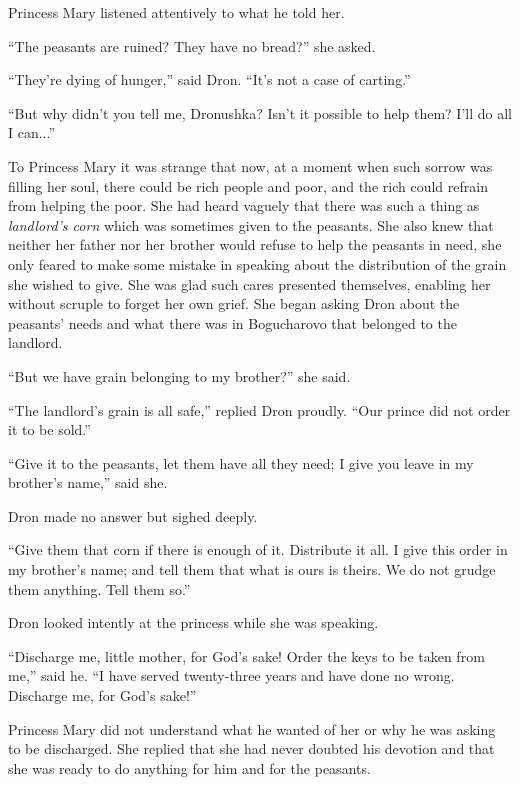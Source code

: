 Princess Mary listened attentively to what he told her.

``The peasants are ruined? They have no bread?'' she asked.

``They're dying of hunger,'' said Dron. ``It's not a case of
carting.''

``But why didn't you tell me, Dronushka? Isn't it possible to
help them?  I'll do all I can...''

To Princess Mary it was strange that now, at a moment when such
sorrow was filling her soul, there could be rich people and poor,
and the rich could refrain from helping the poor. She had heard
vaguely that there was such a thing as \emph{landlord's corn}
which was sometimes given to the peasants. She also knew that
neither her father nor her brother would refuse to help the
peasants in need, she only feared to make some mistake in
speaking about the distribution of the grain she wished to
give. She was glad such cares presented themselves, enabling her
without scruple to forget her own grief. She began asking Dron
about the peasants' needs and what there was in Bogucharovo that
belonged to the landlord.

``But we have grain belonging to my brother?'' she said.

``The landlord's grain is all safe,'' replied Dron proudly. ``Our
prince did not order it to be sold.''

``Give it to the peasants, let them have all they need; I give
you leave in my brother's name,'' said she.

Dron made no answer but sighed deeply.

``Give them that corn if there is enough of it. Distribute it
all. I give this order in my brother's name; and tell them that
what is ours is theirs. We do not grudge them anything. Tell them
so.''

Dron looked intently at the princess while she was speaking.

``Discharge me, little mother, for God's sake! Order the keys to
be taken from me,'' said he. ``I have served twenty-three years
and have done no wrong. Discharge me, for God's sake!''

Princess Mary did not understand what he wanted of her or why he
was asking to be discharged. She replied that she had never
doubted his devotion and that she was ready to do anything for
him and for the peasants.


